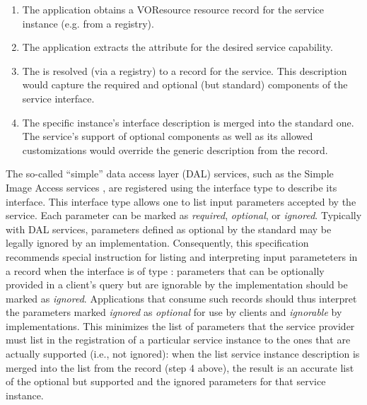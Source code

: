 \documentclass[11pt,a4paper]{ivoa}
\begin{document}
\begin{enumerate}

\item  The application obtains a VOResource resource record for the
       service instance (e.g. from a registry).

\item  The application extracts the  attribute
       for the desired service capability.

\item  The  is resolved (via a registry) to a
        record for the service.  This
       description would capture the required and optional (but
       standard) components of the service interface.

\item  The specific instance's interface description is merged into
       the standard one.  The service's support of optional components
       as well as its allowed customizations would override the
       generic description from the 
       record.

\end{enumerate}

The so-called ``simple'' data access layer (DAL) services, such as the
Simple Image Access services \citep{2015ivoa.spec.1223D}, are
registered using the  interface type
\citep{2021ivoa.spec.1102D}
to describe its interface.  This interface
type allows one to list input parameters accepted by the service.
Each parameter can be marked as \emph{required}, \emph{optional},
or \emph{ignored}.  Typically with DAL services, parameters defined
as optional by the standard may be legally ignored by an
implementation.  Consequently, this specification recommends special
instruction for listing and interpreting input parameteters in a
 record when the interface is of type
:  parameters that can be optionally provided
in a client's query but are ignorable by the implementation should be
marked as \emph{ignored}.  Applications that consume such
 records should thus interpret the
parameters marked \emph{ignored} as \emph{optional} for use by
clients and \emph{ignorable} by implementations.  This minimizes the
list of parameters that the service provider must list in the
registration of a particular service instance to the ones that are
actually supported (i.e., not ignored): when the list service
instance description is merged into the list from the
 record (step 4 above), the result is
an accurate list of the optional but supported and the ignored
parameters for that service instance.
\end{document}
